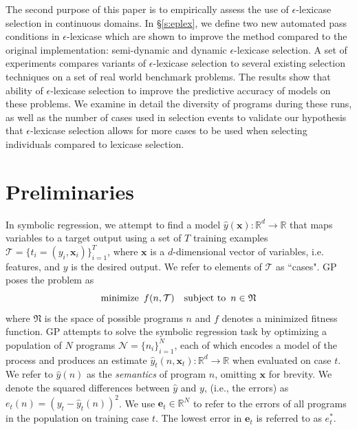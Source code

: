 \documentclass[twoside]{article}
\begin{document}
The second purpose of this paper is to empirically assess the use of $\epsilon$-lexicase selection in continuous domains. In \S\ref{s:eplex}, we define two new automated pass conditions in $\epsilon$-lexicase which are shown to improve the method compared to the original implementation: semi-dynamic and dynamic $\epsilon$-lexicase selection. A set of experiments compares variants of $\epsilon$-lexicase selection to several existing selection techniques on a set of real world benchmark problems. The results show that ability of $\epsilon$-lexicase selection to improve the predictive accuracy of models on these problems. We examine in detail the diversity of programs during these runs, as well as the number of cases used in selection events to validate our hypothesis that $\epsilon$-lexicase selection allows for more cases to be used when selecting individuals compared to lexicase selection.   


\section{Preliminaries}
In symbolic regression, we attempt to find a model $\hat{y}(\mathbf{x}): \mathbb{R}^d \rightarrow \mathbb{R}$ that maps variables to a target output using a set of $T$ training examples $\mathcal{T} = \{t_i = (y_i,\mathbf{x}_i)\}_{i=1}^T$, where $\mathbf{x}$ is a $d$-dimensional vector of variables, i.e. features, and $y$ is the desired output. We refer to elements of $\mathcal{T}$ as ``cases". GP poses the problem as
\begin{equation} \label{eq:gp}
\text{minimize} \hspace{0.5em} {f(n,\mathcal{T})} \hspace{1em} \text{subject to} \hspace{0.5em} {n \in \mathfrak{N}}
\end{equation}
where $\mathfrak{N}$ is the space of possible programs $n$ and $f$ denotes a minimized fitness function. GP attempts to solve the symbolic regression task by optimizing a population of $N$ programs $\mathcal{N} = \{n_i\}_{i=1}^N$, each of which encodes a model of the process and produces an estimate  $\hat{y}_t(n,\mathbf{x}_t): \mathbb{R}^d \rightarrow \mathbb{R}$ when evaluated on case $t$. We refer to $\hat{y}(n)$ as the {\it semantics} of program $n$, omitting $\mathbf{x}$ for brevity. We denote the squared differences between $\hat{y}$ and $y$, (i.e., the errors) as $e_t(n) = (y_t - \hat{y}_t(n))^2$.  We use $\mathbf{e}_t \in \mathbb{R}^N$ to refer to the errors of all programs in the population on training case $t$. The lowest error in $\mathbf{e}_t$ is referred to as $e^*_t$. 
\end{document}
